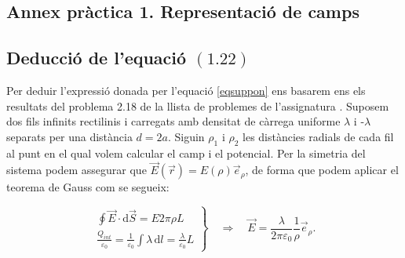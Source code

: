 \documentclass[a4paper,10.5pt]{report}
\begin{document}
\begin{appendices}
\newpage
\section{Annex pràctica 1. Representació de camps}
\subsection{Deducció de l'equació $(1.22)$}
\label{an:a1}
Per deduir l'expressió donada per l'equació \eqref{eqsuppon} ens basarem ens els resultats del problema 2.18 de la llista de problemes de l'assignatura \cite{ref1}. Suposem dos fils infinits rectilinis i carregats amb densitat de càrrega uniforme $\lambda$ i -$\lambda$ separats per una distància $d=2a$. Siguin $\rho_1$ i $\rho_2$ les distàncies radials de cada fil al punt en el qual volem calcular el camp i el potencial. Per la simetria del sistema podem assegurar que $\vec{E}(\vec{r}) = E(\rho) \vec{e}_{\rho}$, de forma que podem aplicar el teorema de Gauss com se segueix:

\[
\left.
\begin{array}{c}
	\oint \vec{E} \cdot \mathrm{d}\vec{S} = E 2\pi \rho L \\[10pt]
	\frac{Q_{int}}{\varepsilon_0} = \frac{1}{\varepsilon_0} \int \lambda \, \mathrm{d}l = \frac{\lambda}{\varepsilon_0} L
\end{array}
\right\}
\quad \Rightarrow \quad 
\vec{E} = \frac{\lambda}{2\pi \varepsilon_0} \frac{1}{\rho} \vec{e}_{\rho}.
\]


\end{appendices}
\end{document}
